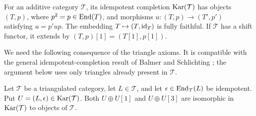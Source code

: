 For an additive category $\mathcal T$, its idempotent completion
$\operatorname{Kar}(\mathcal T)$ has objects $(T,p)$, where $p^2=p\in\operatorname{End}(T)$,
and morphisms $u:(T,p)\to(T',p')$ satisfying $u=p'up$.
The embedding $T\mapsto(T,\operatorname{id}_T)$ is fully faithful.
If $\mathcal T$ has a shift functor, it extends
by $(T,p)[1]=(T[1],p[1])$.

We need the following consequence of the triangle axioms.  It is
compatible with the general idempotent-completion result of
Balmer and Schlichting \cite[Theorem~1.5]{BalmerSchlichting2001}; the argument
below uses only triangles already present in $\mathcal T$.

\begin{lemma}\label{lem:odd-double}
Let $\mathcal T$ be a triangulated category, let $L\in\mathcal T$,
and let $\epsilon\in\operatorname{End}_{\mathcal T}(L)$ be idempotent.
Put $U=(L,\epsilon)\in\operatorname{Kar}(\mathcal T)$.
Both $U\oplus U[1]$ and $U\oplus U[3]$ are isomorphic in
$\operatorname{Kar}(\mathcal T)$ to objects of $\mathcal T$.
\end{lemma}

